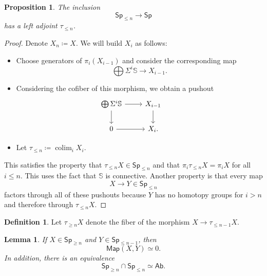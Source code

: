 \documentclass[10pt, oneside]{memoir}
\newtheorem{prop}[thm]{Proposition}
\newtheorem{lem}[thm]{Lemma}
\theoremstyle{definition}
\newtheorem{defn}[thm]{Definition}
\theoremstyle{remark}
\theoremstyle{plain}
\theoremstyle{definition}
\theoremstyle{remark}
\newcommand{\bS}{\mathbb{S}}
\newcommand{\ms}[1]{\mathsf{#1}}
\newcommand{\1}{\mathbf{1}}
\newcommand{\2}{\mathbf{2}}
\newcommand{\3}{\mathbf{3}}
\DeclareMathOperator*{\colim}{colim}
\begin{document}
\begin{prop}
    The inclusion
    \[ \ms{Sp}_{\leq n} \to \ms{Sp} \]
    has a left adjoint $\tau_{\leq n}$.
\end{prop}

\begin{proof}
    Denote $X_n \coloneqq X$. We will build $X_i$ as follows:
    \begin{itemize}
        \item Choose generators of $\pi_i(X_{i-1})$ and consider the corresponding map
        \[ \bigoplus \Sigma^i \bS \to X_{i-1}. \]
        \item Considering the cofiber of this morphism, we obtain a pushout
        \begin{equation*}
        \begin{tikzcd}
            \bigoplus \Sigma^i \bS \ar{r} \ar{d} & X_{i-1} \ar{d} & \\
            0 \ar{r} & X_i.
        \end{tikzcd}
        \end{equation*}
        \item Let $\tau_{\leq n} \coloneqq \colim_i X_i$.
    \end{itemize}
    This satisfies the property that $\tau_{\leq n} X \in \ms{Sp}_{\leq n}$ and that $\pi_i \tau_{\leq n} X = \pi_i X$ for all $i \leq n$. This uses the fact that $\bS$ is connective. Another property is that every map
    \[ X \to Y \in \ms{Sp}_{\leq n} \]
    factors through all of these pushouts because $Y$ has no homotopy groups for $i > n$ and therefore through $\tau_{\leq n} X$.
\end{proof}

\begin{defn}
    Let $\tau_{\geq n} X$ denote the fiber of the morphism $X \to \tau_{\leq n-1} X$.
\end{defn}

\begin{lem}
    If $X \in \ms{Sp}_{\geq n}$ and $Y \in \ms{Sp}_{\leq n-1}$, then
    \[ \ms{Map}(X, Y) \simeq 0. \]
    In addition, there is an equivalence
    \[ \ms{Sp}_{\geq n} \cap \ms{Sp}_{\leq n} \simeq \ms{Ab}. \]
\end{lem}
\end{document}
